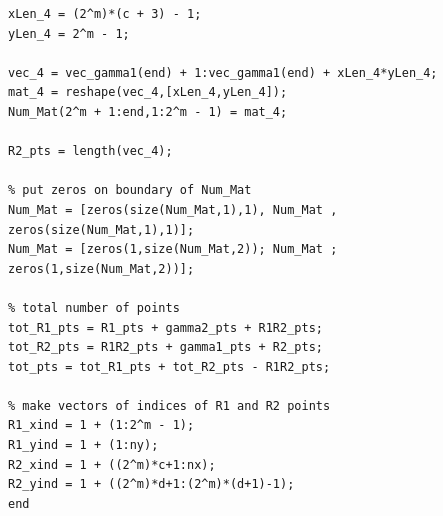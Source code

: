 \documentclass[12pt]{article}
\begin{document}
\begin{lstlisting}[caption=Enumeration for b equals 0]
% part of R2 sticking out of R1
xLen_4 = (2^m)*(c + 3) - 1;
yLen_4 = 2^m - 1;

vec_4 = vec_gamma1(end) + 1:vec_gamma1(end) + xLen_4*yLen_4;
mat_4 = reshape(vec_4,[xLen_4,yLen_4]);
Num_Mat(2^m + 1:end,1:2^m - 1) = mat_4;

R2_pts = length(vec_4);

% put zeros on boundary of Num_Mat
Num_Mat = [zeros(size(Num_Mat,1),1), Num_Mat , zeros(size(Num_Mat,1),1)];
Num_Mat = [zeros(1,size(Num_Mat,2)); Num_Mat ; zeros(1,size(Num_Mat,2))];

% total number of points
tot_R1_pts = R1_pts + gamma2_pts + R1R2_pts;
tot_R2_pts = R1R2_pts + gamma1_pts + R2_pts;
tot_pts = tot_R1_pts + tot_R2_pts - R1R2_pts;

% make vectors of indices of R1 and R2 points
R1_xind = 1 + (1:2^m - 1);
R1_yind = 1 + (1:ny);
R2_xind = 1 + ((2^m)*c+1:nx);
R2_yind = 1 + ((2^m)*d+1:(2^m)*(d+1)-1);
end
\end{lstlisting}
\end{document}
